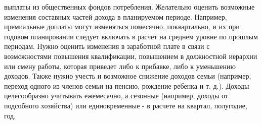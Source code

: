 выплаты из общественных фондов потребления. Желательно оценить возможные изменения составных частей дохода в планируемом периоде. Например, премиальные доплаты могут изменяться помесячно, поквартально, и их
при годовом планировании следует включать в расчет на среднем уровне по
прошлым периодам. Нужно оценить изменения в заработной плате в связи с возможностями повышения квалификации, повышением в должностной
иерархии или смену работы, которая приведет либо к прибавке, либо к уменьшению доходов. Также нужно учесть и возможное снижение доходов семьи
(например, переход одного из членов семьи на пенсию, рождение ребенка и
т. д.).
Доходы целесообразно учитывать ежемесячно, а сезонные (например, доходы от подсобного хозяйства) или единовременные - в расчете на квартал,
полугодие, год.